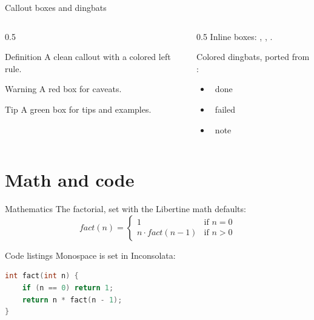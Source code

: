 \documentclass[
	aspectratio=169, %
]{beamer}
\begin{document}
\begin{frame}{Callout boxes and dingbats}
	\begin{columns}[T]
		\begin{column}{0.5\textwidth}
			\begin{infobox}{Definition}
				A clean callout with a colored left rule.
			\end{infobox}
			\begin{warnbox}{Warning}
				A red box for caveats.
			\end{warnbox}
			\begin{tipbox}{Tip}
				A green box for tips and examples.
			\end{tipbox}
		\end{column}
		\begin{column}{0.5\textwidth}
			Inline boxes: , ,
			.
			\medskip

			Colored dingbats, ported from :
			\begin{itemize}
				\item {}~done
				\item {}~failed
				\item {}~note
			\end{itemize}
		\end{column}
	\end{columns}
\end{frame}

\section{Math and code}

\begin{frame}{Mathematics}
	The factorial, set with the Libertine math defaults:
	\begin{equation*}
		fact(n) = \begin{cases}
			1                 & \text{if } n = 0 \\
			n \cdot fact(n-1) & \text{if } n > 0
		\end{cases}
	\end{equation*}
\end{frame}

\begin{frame}[fragile]{Code listings}
	Monospace is set in Inconsolata:
\begin{lstlisting}[basicstyle=\ttfamily\small, keywordstyle=\color{scribeaccent}\bfseries, language=C]
int fact(int n) {
    if (n == 0) return 1;
    return n * fact(n - 1);
}
\end{lstlisting}
\end{frame}
\end{document}

